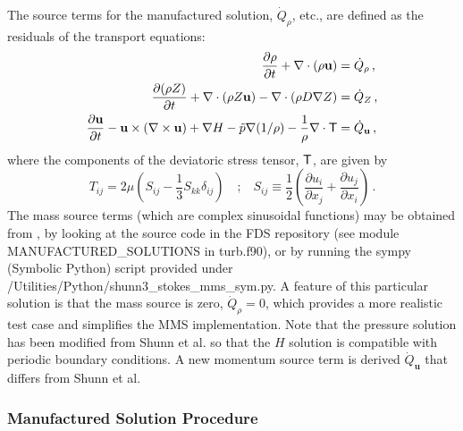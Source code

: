 \documentclass[11pt]{book}
\begin{document}

The source terms for the manufactured solution, $\dot{Q}_\rho$, etc., are defined as the residuals of the transport equations:
\begin{align}
\label{eqn_mms_continuity} \frac{\partial \rho}{\partial t} + \nabla\cdot(\rho \mathbf{u}) &= \dot{Q}_\rho \,\mbox{,}\\
\frac{\partial (\rho Z)}{\partial t} + \nabla\cdot(\rho Z \mathbf{u}) - \nabla\cdot\left(\rho D \nabla Z\right) &= \dot{Q}_Z \,\mbox{,}\\
\frac{\partial \mathbf{u}}{\partial t} - \mathbf{u} \times (\nabla \times \mathbf{u}) + \nabla H - \tilde{p} \nabla(1/\rho) - \frac{1}{\rho}\nabla\cdot{\sf T} &= \dot{Q}_{\mathbf{u}} \,\mbox{,}
\end{align}
where the components of the deviatoric stress tensor, ${\sf T}$, are given by
\begin{equation}
T_{ij} = 2\mu \left( S_{ij} -  \frac{1}{3} S_{kk} \delta_{ij} \right) \quad\mbox{;}\quad S_{ij} \equiv \frac{1}{2}\left( \frac{\partial u_i}{\partial x_j} + \frac{\partial u_j}{\partial x_i} \right) \,\mbox{.}
\end{equation}
The mass source terms (which are complex sinusoidal functions) may be obtained from \cite{Shunn:2012}, by looking at the source code in the FDS repository \cite{FDS-SMV_repository} (see module {\ct MANUFACTURED\_SOLUTIONS} in {\ct turb.f90}), or by running the sympy (Symbolic Python) script provided under\\
{\ct /Utilities/Python/shunn3\_stokes\_mms\_sym.py}.  A feature of this particular solution is that the mass source is zero, $\dot{Q}_\rho = 0$, which provides a more realistic test case and simplifies the MMS implementation.  Note that the pressure solution has been modified from Shunn et al. \cite{Shunn:2012} so that the $H$ solution is compatible with periodic boundary conditions.  A new momentum source term is derived $\dot{Q}_{\mathbf{u}}$ that differs from Shunn et al.

\subsubsection*{Manufactured Solution Procedure}
\end{document}

